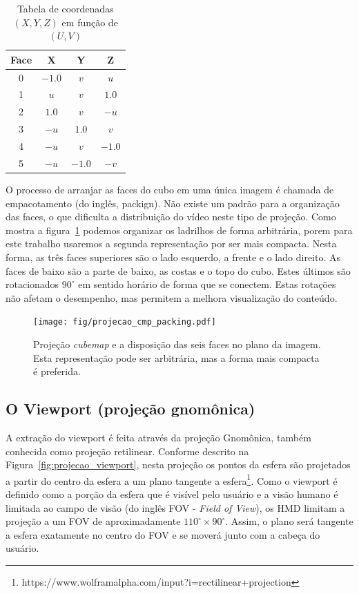 \begin{table}[h]
	\centering
	\caption{Tabela de coordenadas $(X, Y, Z)$ em função de $(U, V)$}
	\label{tab:vu2xyz}
	\begin{tabular}{|c|c|c|c|}
		\hline
		\textbf{Face} & \textbf{X} & \textbf{Y} & \textbf{Z} \\
		\hline
		0 & $-1.0$ & $v$    & $u$    \\
		1 & $u$    & $v$    & $1.0$  \\
		2 & $1.0$  & $v$    & $-u$   \\
		3 & $-u$   & $1.0$  & $v$    \\
		4 & $-u$   & $v$    & $-1.0$ \\
		5 & $-u$   & $-1.0$ & $-v$   \\
		\hline
	\end{tabular}
\end{table}

O processo de arranjar as faces do cubo em uma única imagem é chamada de empacotamento (do inglês, packign). Não existe um padrão para a organização das faces, o que dificulta a distribuição do vídeo neste tipo de projeção. Como mostra a figura~\ref{fig:projecao_cmp_packing} podemos organizar os ladrilhos de forma arbitrária, porem para este trabalho usaremos a segunda representação por ser mais compacta. Nesta forma, as três faces superiores são o lado esquerdo, a frente e o lado direito. As faces de baixo são a parte de baixo, as costas e o topo do cubo. Estes últimos são rotacionados $90^\circ$ em sentido horário de forma que se conectem. Estas rotações não afetam o desempenho, mas permitem a melhora visualização do conteúdo.

\begin{figure}[h]
	\centering
	\texttt{[image: fig/projecao\_cmp\_packing.pdf]}
	\caption{Projeção \textit{cubemap} e a disposição das seis faces no plano da imagem. Esta representação pode ser arbitrária, mas a forma mais compacta é preferida.}
	\label{fig:projecao_cmp_packing}
\end{figure}

\subsection{O Viewport (projeção gnomônica)}

A extração do viewport é feita através da projeção Gnomônica, também conhecida como projeção retilinear. Conforme descrito na Figura~\ref{fig:projecao_viewport}, nesta projeção os pontos da esfera são projetados a partir do centro da esfera a um plano tangente a esfera\footnote{https://www.wolframalpha.com/input?i=rectilinear+projection}. Como o viewport é definido como a porção da esfera que é visível pelo usuário e a visão humano é limitada ao campo de visão (do inglês FOV - \textit{ Field of View}), os HMD limitam a projeção a um FOV de aproximadamente $110^\circ\times 90^\circ$. Assim, o plano será tangente a esfera exatamente no centro do FOV e se moverá junto com a cabeça do usuário.

